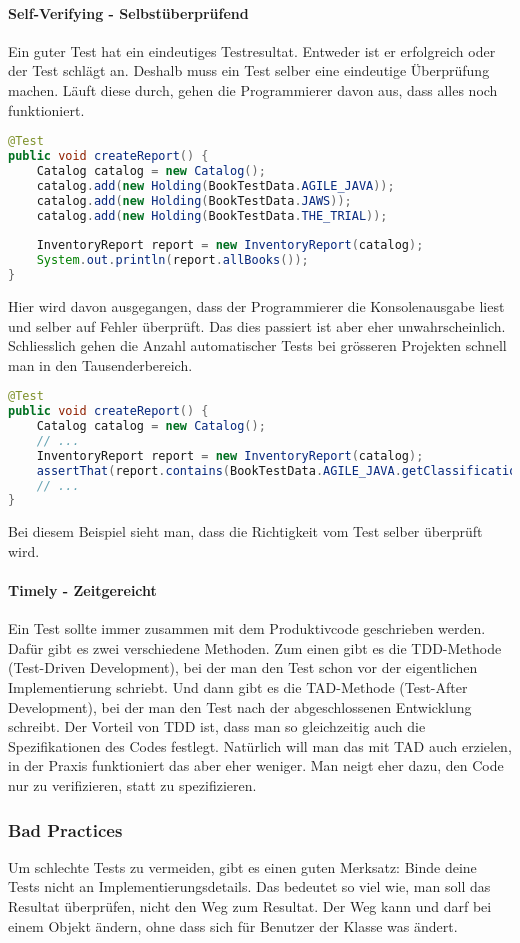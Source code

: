 \paragraph{Self-Verifying - Selbstüberprüfend}
Ein guter Test hat ein eindeutiges Testresultat. Entweder ist er erfolgreich oder der Test schlägt an. Deshalb muss ein Test selber eine eindeutige Überprüfung machen. Läuft diese durch, gehen die Programmierer davon aus, dass alles noch funktioniert. 
\begin{lstlisting}[language=Java, caption={Schlechtes Beispiel}]
@Test
public void createReport() {
	Catalog catalog = new Catalog();
	catalog.add(new Holding(BookTestData.AGILE_JAVA));
	catalog.add(new Holding(BookTestData.JAWS));
	catalog.add(new Holding(BookTestData.THE_TRIAL));
 	
	InventoryReport report = new InventoryReport(catalog);
	System.out.println(report.allBooks());
}
\end{lstlisting}
Hier wird davon ausgegangen, dass der Programmierer die Konsolenausgabe liest und selber auf Fehler überprüft. Das dies passiert ist aber eher unwahrscheinlich. Schliesslich gehen die Anzahl automatischer Tests bei grösseren Projekten schnell man in den Tausenderbereich.
\begin{lstlisting}[language=Java, caption={Gutes Beispiel}]
@Test
public void createReport() {
	Catalog catalog = new Catalog();
	// ...
	InventoryReport report = new InventoryReport(catalog);
	assertThat(report.contains(BookTestData.AGILE_JAVA.getClassification());
	// ...
}
\end{lstlisting}
Bei diesem Beispiel sieht man, dass die Richtigkeit vom Test selber überprüft wird.
\paragraph{Timely - Zeitgereicht}
Ein Test sollte immer zusammen mit dem Produktivcode geschrieben werden. Dafür gibt es zwei verschiedene Methoden. Zum einen gibt es die TDD-Methode (Test-Driven Development), bei der man den Test schon vor der eigentlichen Implementierung schriebt. Und dann gibt es die TAD-Methode (Test-After Development), bei der man den Test nach der abgeschlossenen Entwicklung schreibt. Der Vorteil von TDD ist, dass man so gleichzeitig auch die Spezifikationen des Codes festlegt. Natürlich will man das mit TAD auch erzielen, in der Praxis funktioniert das aber eher weniger. Man neigt eher dazu, den Code nur zu verifizieren, statt zu spezifizieren. 
\cite{web:unittestsfirst}
\subsubsection{Bad Practices}
Um schlechte Tests zu vermeiden, gibt es einen guten Merksatz: Binde deine Tests nicht an Implementierungsdetails. Das bedeutet so viel wie, man soll das Resultat überprüfen, nicht den Weg zum Resultat. Der Weg kann und darf bei einem Objekt ändern, ohne dass sich für Benutzer der Klasse was ändert.
